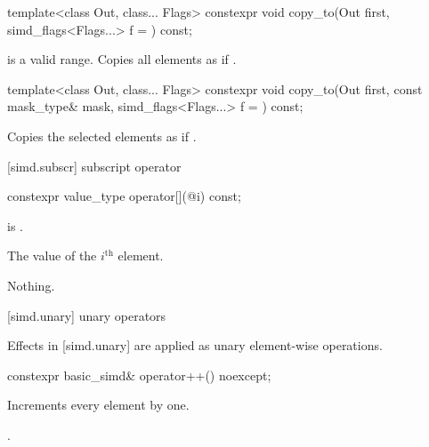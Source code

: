 \begin{itemdecl}
template<class Out, class... Flags>
  constexpr void copy_to(Out first, simd_flags<Flags...> f = {}) const;
\end{itemdecl}

\begin{itemdescr}
  \SimdStoreDescr
    { is a valid range.}
    {Copies all  elements as if  \foralli.}
\end{itemdescr}

\begin{itemdecl}
template<class Out, class... Flags>
  constexpr void copy_to(Out first, const mask_type& mask, simd_flags<Flags...> f = {}) const;
\end{itemdecl}

\begin{itemdescr}
  \SimdStoreDescr
    {\validMaskedRange}
    {Copies the selected elements as if  \forallmaskedi.}
\end{itemdescr}

[simd.subscr]{ subscript operator}

\begin{itemdecl}
constexpr value_type operator[](@\simdsizetype@ i) const;
\end{itemdecl}

\begin{itemdescr}
  \pnum\expects
   is .

  \pnum\returns
  The value of the $i^\text{th}$ element.

  \pnum\throws Nothing.
\end{itemdescr}

[simd.unary]{ unary operators}

\pnum
Effects in [simd.unary] are applied as unary element-wise operations.

\begin{itemdecl}
constexpr basic_simd& operator++() noexcept;
\end{itemdecl}

\begin{itemdescr}
  \pnum{}

  \pnum\effects
  Increments every element by one.

  \pnum\returns
  .
\end{itemdescr}

